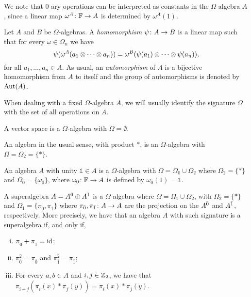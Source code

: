 We note that $0$-ary operations can be interpreted as constants in the $\Omega$-algebra $A$, since a linear map $\omega^A\colon \mathbb{F} \to A$ is determined by $\omega^A(1)$.

\begin{defi}
    Let $A$ and $B$ be $\Omega$-algebras. 
    A \emph{homomorphism} $\psi\colon A \to B$ is a linear map such that for every $\omega \in \Omega_n$ we have
    \[
        \psi( \omega^A (a_1 \otimes \cdots \otimes a_n) ) = \omega^B ( \psi(a_1) \otimes \cdots \otimes \psi(a_n) ),
    \]
    for all $a_1, \ldots, a_n \in A$. 
    As usual, an \emph{automorphism} of $A$ is a bijective homomorphism from $A$ to itself and the group of automorphisms is denoted by $\operatorname{Aut}(A)$.
\end{defi}

When dealing with a fixed $\Omega$-algebra $A$, we will usually identify the signature $\Omega$ with the set of all operations on $A$.

\begin{ex}\label{ex:omega-vec-space}
    A vector space is a $\Omega$-algebra with $\Omega = \emptyset$.
\end{ex}

\begin{ex}\label{ex:omega-algebra}
    An algebra in the usual sense, with product $*$, is an $\Omega$-algebra with $\Omega = \Omega_2 = \{ * \}$. 
\end{ex}

\begin{ex}
    An algebra $A$ with unity $\mathds{1} \in A$ is a  $\Omega$-algebra with $\Omega = \Omega_0 \cup \Omega_2$ where $\Omega_2 = \{ * \}$ and $\Omega_0 = \{ \omega_0 \}$, where $\omega_0\colon \mathbb{F} \to A$ is defined by $\omega_0 (1) = \mathds 1$.
\end{ex}

\begin{ex}\label{ex:omega-alg-SA}
    A superalgebra $A = A^{\bar0} \oplus A^{\bar1}$ is a $\Omega$-algebra where $\Omega = \Omega_1 \cup \Omega_2$, with $\Omega_2 = \{ * \}$ and $\Omega_1 = \{ \pi_{\bar 0}, \pi_{\bar 1} \}$ where $\pi_{\bar 0}, \pi_{\bar 1}\colon A \to A$ are the projection on the $A^{\bar0}$ and $A^{\bar1}$, respectively. 
    More precisely, we have that an algebra $A$ with such signature is a superalgebra if, and only if,
    \begin{enumerate}[(i)]
        \item $\pi_{\bar 0}^{} + \pi_{\bar 1}^{} = \operatorname{id}$; \label{item:sum-projections}
        \item $\pi_{\bar 0}^2 = \pi_{\bar 0}^{}$ and $\pi_{\bar 1}^2 = \pi_{\bar 1}^{}$;
        \item For every $a,b \in A$ and $i, j\in \mathbb{Z}_2$, we have that $\pi_{i+j}^{}( \pi_i^{} (x)*\pi_j^{} (y) ) = \pi_i^{} (x)*\pi_j^{} (y)$.
    \end{enumerate}
\end{ex}

